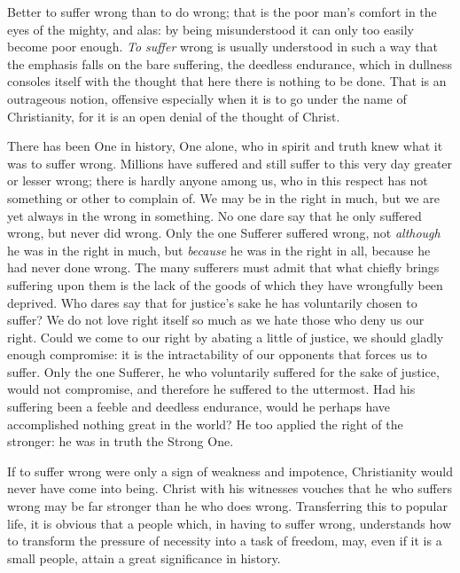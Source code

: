 \documentclass[12pt,a4paper,openany]{book}
\newcommand{\opage}[1]{\marginnote{\footnotesize\textit{[#1]}}}
\begin{document}
Better to suffer wrong than to do wrong; that is
the poor man's comfort in the eyes of the mighty, and alas:
by being misunderstood it can only too easily become poor
enough. \emph{To suffer} wrong is usually understood
in such a way that the emphasis falls on the bare suffering,
the deedless endurance, which in dullness consoles itself with the thought
that here there is nothing to be done. That is an outrageous notion,
offensive especially when it is to go under
the name of Christianity, for it is an open denial
of the thought of Christ.

There has been One in history, One alone, who
in spirit and truth knew what it was to suffer wrong.
Millions have suffered and still suffer to this very day greater
or lesser wrong; there is hardly anyone among us,
\setcounter{footnote}{0}%
\opage{98}who in this respect has not something or other
to complain of. We may be in the right in much, but
we are yet always in the wrong in something. No one dare say that he
only suffered wrong, but never did wrong. Only the one
Sufferer suffered wrong, not \emph{although} he was in the right in
much, but \emph{because} he was in the right in all, because he had never
done wrong. The many sufferers must admit
that what chiefly brings suffering upon them is the lack of
the goods of which they have wrongfully been deprived. Who dares
say that for justice's sake he has voluntarily
chosen to suffer? We do not love right itself so much
as we hate those who deny us our right. Could we
come to our right by abating a little of justice,
we should gladly enough compromise: it is the intractability
of our opponents that forces us to suffer.
Only the one Sufferer, he who voluntarily suffered for the sake of justice,
would not compromise, and
therefore he suffered to the uttermost. Had his suffering
been a feeble and deedless endurance, would he perhaps have accomplished nothing
great in the world? He too applied the
right of the stronger: he was in truth the Strong One.

If to suffer wrong were only a sign of
weakness and impotence, Christianity would never
have come into being. Christ with his witnesses vouches
that he who suffers wrong may be far stronger
than he who does wrong. Transferring this to popular life,
it is obvious that a people which, in
having to suffer wrong, understands how to transform the
pressure of necessity into a task of freedom, may, even if it is a
small people, attain a great significance in history.
\end{document}
